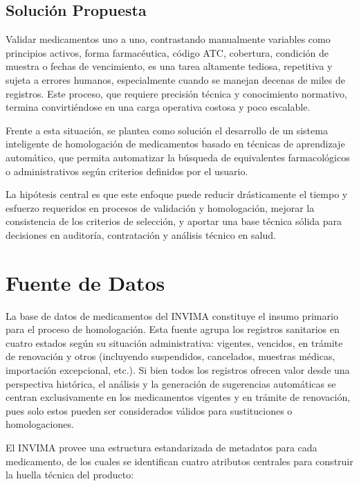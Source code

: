 \documentclass[conference]{IEEEtran}
\begin{document}
\subsection{Solución Propuesta}
Validar medicamentos uno a uno, contrastando manualmente variables como principios activos, forma farmacéutica, código ATC, cobertura, condición de muestra o fechas de vencimiento, es una tarea altamente tediosa, repetitiva y sujeta a errores humanos, especialmente cuando se manejan decenas de miles de registros. Este proceso, que requiere precisión técnica y conocimiento normativo, termina convirtiéndose en una carga operativa costosa y poco escalable.

Frente a esta situación, se plantea como solución el desarrollo de un sistema inteligente de homologación de medicamentos basado en técnicas de aprendizaje automático, que permita automatizar la búsqueda de equivalentes farmacológicos o administrativos según criterios definidos por el usuario.

La hipótesis central es que este enfoque puede reducir drásticamente el tiempo y esfuerzo requeridos en procesos de validación y homologación, mejorar la consistencia de los criterios de selección, y aportar una base técnica sólida para decisiones en auditoría, contratación y análisis técnico en salud.


\section{Fuente de Datos}

La base de datos de medicamentos del INVIMA constituye el insumo primario para el proceso de homologación. Esta fuente agrupa los registros sanitarios en cuatro estados según su situación administrativa: vigentes, vencidos, en trámite de renovación y otros (incluyendo suspendidos, cancelados, muestras médicas, importación excepcional, etc.)\cite{invima2025}. Si bien todos los registros ofrecen valor desde una perspectiva histórica, el análisis y la generación de sugerencias automáticas se centran exclusivamente en los medicamentos vigentes y en trámite de renovación, pues solo estos pueden ser considerados válidos para sustituciones o homologaciones\cite{minsalud2024}.

El INVIMA provee una estructura estandarizada de metadatos para cada medicamento, de los cuales se identifican cuatro atributos centrales para construir la huella técnica del producto:
\end{document}
